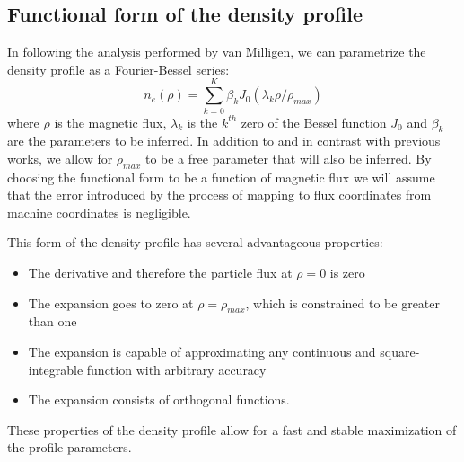 \documentclass[12pt]{article}
\numberwithin{equation}{section}
\begin{document}
\subsection{Functional form of the density profile}
In following the analysis performed by van Milligen, we can parametrize the density profile as a Fourier-Bessel series:
\begin{equation} \label{eq:densityform}
	n_e(\rho) = \sum\limits_{k=0}^K \beta_k J_0(\lambda_k \rho/
	\rho_{max})
\end{equation}
where $\rho$ is the magnetic flux, $\lambda_k$ is the $k^{th}$ zero of the Bessel function $J_0$ and $\beta_k$ are the parameters to be inferred. In addition to and in contrast with previous works, we allow for $\rho_{max}$ to be a free parameter that will also be inferred. By choosing the functional form to be a function of magnetic flux we will assume that the error introduced by the process of mapping to flux coordinates from machine coordinates is negligible.

This form of the density profile has several advantageous properties:
\begin{itemize}
	\item The derivative and therefore the particle flux at $\rho = 0$ is zero
	\item The expansion goes to zero at $\rho = \rho_{max}$, which is constrained to be greater than one  
	\item The expansion is capable of approximating any continuous and square-integrable function with arbitrary accuracy
	\item The expansion consists of orthogonal functions.
\end{itemize}
These properties of the density profile allow for a fast and stable maximization of the profile parameters. 
\end{document}
